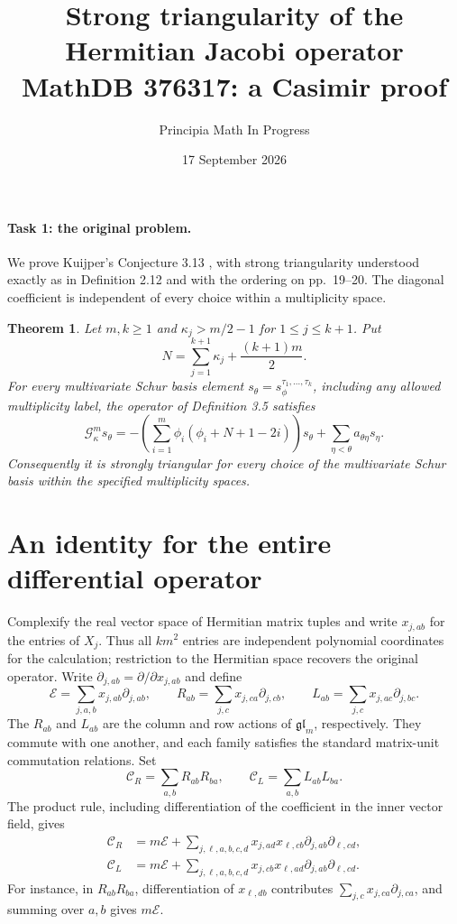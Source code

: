 \documentclass[11pt]{article}
\title{Strong triangularity of the Hermitian Jacobi operator\\\large MathDB 376317: a Casimir proof}
\author{Principia Math In Progress}
\date{17 September 2026}
\newtheorem{theorem}{Theorem}
\newcommand{\G}{\mathcal G}
\newcommand{\E}{\mathcal E}
\newcommand{\C}{\mathcal C}
\begin{document}
\maketitle

\paragraph{Task 1: the original problem.}
We prove Kuijper's Conjecture 3.13 \cite{K}, with strong triangularity
understood exactly as in Definition 2.12 and with the ordering on
pp.~19--20. The diagonal coefficient is independent of every choice
within a multiplicity space.

\begin{theorem}\label{thm}
Let $m,k\ge1$ and $\kappa_j>m/2-1$ for $1\le j\le k+1$. Put
\[
 N=\sum_{j=1}^{k+1}\kappa_j+\frac{(k+1)m}{2}.
\]
For every multivariate Schur basis element
$s_\theta=s^{\tau_1,\ldots,\tau_k}_\phi$, including any allowed
multiplicity label, the operator of Definition 3.5 satisfies
\begin{equation}\label{eq:result}
 \G^m_\kappa s_\theta
 =-\left(\sum_{i=1}^m\phi_i(\phi_i+N+1-2i)\right)s_\theta
   +\sum_{\eta<\theta}a_{\theta\eta}s_\eta.
\end{equation}
Consequently it is strongly triangular for every choice of the
multivariate Schur basis within the specified multiplicity spaces.
\end{theorem}

\section*{An identity for the entire differential operator}
Complexify the real vector space of Hermitian matrix tuples and write
$x_{j,ab}$ for the entries of $X_j$. Thus all $km^2$ entries are independent
polynomial coordinates for the calculation; restriction to the Hermitian
space recovers the original operator. Write
$\partial_{j,ab}=\partial/\partial x_{j,ab}$ and define
\[
 \E=\sum_{j,a,b}x_{j,ab}\partial_{j,ab},\qquad
 R_{ab}=\sum_{j,c}x_{j,ca}\partial_{j,cb},\qquad
 L_{ab}=\sum_{j,c}x_{j,ac}\partial_{j,bc}.
\]
The $R_{ab}$ and $L_{ab}$ are the column and row actions of
$\mathfrak{gl}_m$, respectively. They commute with one another, and each
family satisfies the standard matrix-unit commutation relations. Set
\[
 \C_R=\sum_{a,b}R_{ab}R_{ba},\qquad
 \C_L=\sum_{a,b}L_{ab}L_{ba}.
\]
The product rule, including differentiation of the coefficient in the
inner vector field, gives
\begin{align}
 \C_R&=m\E+\sum_{j,\ell,a,b,c,d}
 x_{j,ad}x_{\ell,cb}\partial_{j,ab}\partial_{\ell,cd},\label{eq:CR}\\
 \C_L&=m\E+\sum_{j,\ell,a,b,c,d}
 x_{j,cb}x_{\ell,ad}\partial_{j,ab}\partial_{\ell,cd}.\label{eq:CL}
\end{align}
For instance, in $R_{ab}R_{ba}$, differentiation of $x_{\ell,db}$
contributes $\sum_{j,c}x_{j,ca}\partial_{j,ca}$, and summing over
$a,b$ gives $m\E$.
\end{document}
